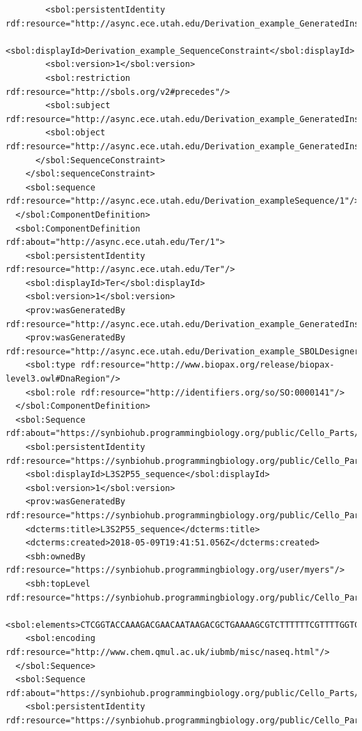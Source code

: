 \begin{lstlisting}
        <sbol:persistentIdentity rdf:resource="http://async.ece.utah.edu/Derivation_example_GeneratedInstance11/Derivation_example_SequenceConstraint"/>
        <sbol:displayId>Derivation_example_SequenceConstraint</sbol:displayId>
        <sbol:version>1</sbol:version>
        <sbol:restriction rdf:resource="http://sbols.org/v2#precedes"/>
        <sbol:subject rdf:resource="http://async.ece.utah.edu/Derivation_example_GeneratedInstance11/Pro_Component/1"/>
        <sbol:object rdf:resource="http://async.ece.utah.edu/Derivation_example_GeneratedInstance11/Gen_Component/1"/>
      </sbol:SequenceConstraint>
    </sbol:sequenceConstraint>
    <sbol:sequence rdf:resource="http://async.ece.utah.edu/Derivation_exampleSequence/1"/>
  </sbol:ComponentDefinition>
  <sbol:ComponentDefinition rdf:about="http://async.ece.utah.edu/Ter/1">
    <sbol:persistentIdentity rdf:resource="http://async.ece.utah.edu/Ter"/>
    <sbol:displayId>Ter</sbol:displayId>
    <sbol:version>1</sbol:version>
    <prov:wasGeneratedBy rdf:resource="http://async.ece.utah.edu/Derivation_example_GeneratedInstance21_SBOLDesignerActivity/1"/>
    <prov:wasGeneratedBy rdf:resource="http://async.ece.utah.edu/Derivation_example_SBOLDesignerActivity/1"/>
    <sbol:type rdf:resource="http://www.biopax.org/release/biopax-level3.owl#DnaRegion"/>
    <sbol:role rdf:resource="http://identifiers.org/so/SO:0000141"/>
  </sbol:ComponentDefinition>
  <sbol:Sequence rdf:about="https://synbiohub.programmingbiology.org/public/Cello_Parts/L3S2P55_sequence/1">
    <sbol:persistentIdentity rdf:resource="https://synbiohub.programmingbiology.org/public/Cello_Parts/L3S2P55_sequence"/>
    <sbol:displayId>L3S2P55_sequence</sbol:displayId>
    <sbol:version>1</sbol:version>
    <prov:wasGeneratedBy rdf:resource="https://synbiohub.programmingbiology.org/public/Cello_Parts/CelloUCF2sbol_Activity/1"/>
    <dcterms:title>L3S2P55_sequence</dcterms:title>
    <dcterms:created>2018-05-09T19:41:51.056Z</dcterms:created>
    <sbh:ownedBy rdf:resource="https://synbiohub.programmingbiology.org/user/myers"/>
    <sbh:topLevel rdf:resource="https://synbiohub.programmingbiology.org/public/Cello_Parts/L3S2P55_sequence/1"/>
    <sbol:elements>CTCGGTACCAAAGACGAACAATAAGACGCTGAAAAGCGTCTTTTTTCGTTTTGGTCC</sbol:elements>
    <sbol:encoding rdf:resource="http://www.chem.qmul.ac.uk/iubmb/misc/naseq.html"/>
  </sbol:Sequence>
  <sbol:Sequence rdf:about="https://synbiohub.programmingbiology.org/public/Cello_Parts/P1_sequence/1">
    <sbol:persistentIdentity rdf:resource="https://synbiohub.programmingbiology.org/public/Cello_Parts/P1_sequence"/>

\end{lstlisting}
